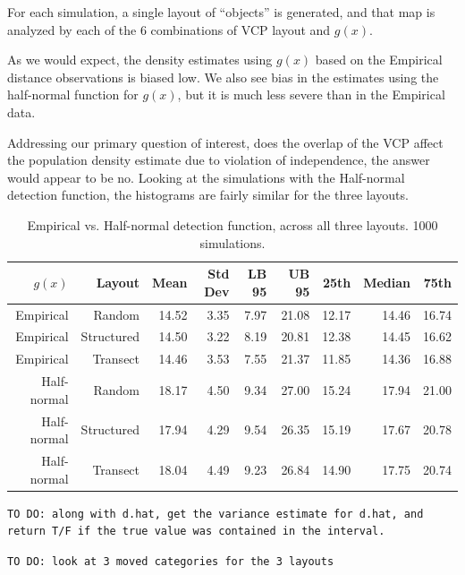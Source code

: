 \documentclass[12pt]{article}
\begin{document}
For each simulation, a single layout of ``objects'' is generated, and that map is analyzed by each of the 6 combinations of VCP layout and $g(x)$. 

As we would expect, the density estimates using $g(x)$ based on the Empirical distance observations is biased low. We also see bias in the estimates using the half-normal function for $g(x)$, but it is much less severe than in the Empirical data.

Addressing our primary question of interest, does the overlap of the VCP affect the population density estimate due to violation of independence, the answer would appear to be no. Looking at the simulations with the Half-normal detection function, the histograms are fairly similar for the three layouts. 

\begin{table}
	\caption{Empirical vs. Half-normal detection function, across all three layouts. 1000 simulations.}
	\begin{tabular}{ r r r r r r r r r}
	   $g(x)$	 & Layout		& Mean	& Std Dev	& LB 95 & UB 95	& 25th	& Median	&  75th \\ \hline \hline
	   Empirical & Random		& 14.52 & 3.35 		& 7.97	& 21.08	& 12.17	& 14.46	& 16.74\\
	   Empirical & Structured	& 14.50 & 3.22 		& 8.19 	& 20.81 & 12.38 & 14.45 & 16.62\\
	   Empirical & Transect		& 14.46 & 3.53 		& 7.55 	& 21.37 & 11.85 & 14.36 & 16.88\\ \hline
	 Half-normal & Random 		& 18.17 & 4.50 		& 9.34 	& 27.00 & 15.24 & 17.94 & 21.00\\
	 Half-normal & Structured	& 17.94 & 4.29 		& 9.54 	& 26.35 & 15.19 & 17.67 & 20.78\\
	 Half-normal & Transect		& 18.04 & 4.49 		& 9.23 	& 26.84 & 14.90 & 17.75 & 20.74\\

	\end{tabular}
	\label{table:sim1}
\end{table}



\texttt{TO DO: along with d.hat, get the variance estimate for d.hat, and return T/F if the true value was contained in the interval.}

\texttt{TO DO: look at 3 moved categories for the 3 layouts}
\end{document}

